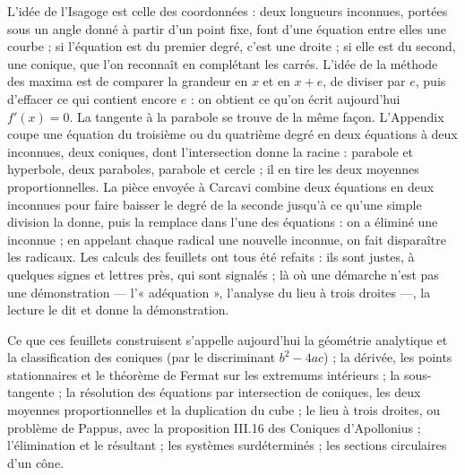 \documentclass[11pt,a4paper]{article}
\begin{document}
\begin{resume}
L'idée de l'Isagoge est celle des coordonnées : deux longueurs inconnues,
portées sous un angle donné à partir d'un point fixe, font d'une équation entre
elles une courbe ; si l'équation est du premier degré, c'est une droite ; si
elle est du second, une conique, que l'on reconnaît en complétant les carrés.
L'idée de la méthode des maxima est de comparer la grandeur en $x$ et en $x+e$,
de diviser par $e$, puis d'effacer ce qui contient encore $e$ : on obtient ce
qu'on écrit aujourd'hui $f'(x)=0$. La tangente à la parabole se trouve de la
même façon. L'Appendix coupe une équation du troisième ou du quatrième degré en
deux équations à deux inconnues, deux coniques, dont l'intersection donne la
racine : parabole et hyperbole, deux paraboles, parabole et cercle ; il en tire
les deux moyennes proportionnelles. La pièce envoyée à Carcavi combine deux
équations en deux inconnues pour faire baisser le degré de la seconde jusqu'à ce
qu'une simple division la donne, puis la remplace dans l'une des équations : on
a éliminé une inconnue ; en appelant chaque radical une nouvelle inconnue, on
fait disparaître les radicaux. Les calculs des feuillets ont tous été refaits :
ils sont justes, à quelques signes et lettres près, qui sont signalés ; là où
une démarche n'est pas une démonstration — l'« adéquation », l'analyse du lieu à
trois droites —, la lecture le dit et donne la démonstration.

Ce que ces feuillets construisent s'appelle aujourd'hui la géométrie analytique
et la classification des coniques (par le discriminant $b^2-4ac$) ; la dérivée,
les points stationnaires et le théorème de Fermat sur les extremums intérieurs ;
la sous-tangente ; la résolution des équations par intersection de coniques, les
deux moyennes proportionnelles et la duplication du cube ; le lieu à trois
droites, ou problème de Pappus, avec la proposition III.16 des Coniques
d'Apollonius ; l'élimination et le résultant ; les systèmes surdéterminés ; les
sections circulaires d'un cône.

\end{resume}
\end{document}
